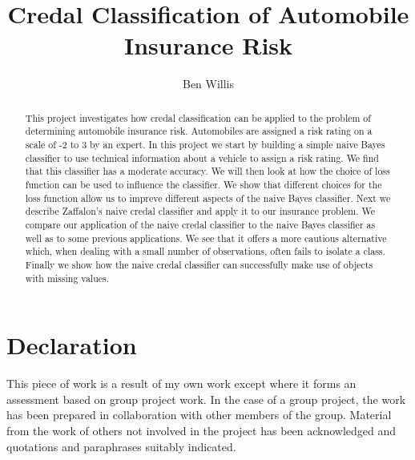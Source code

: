 \documentclass[11pt]{report}
\begin{document}
\title{Credal Classification of Automobile Insurance Risk}
\author{Ben Willis}
\maketitle

\section*{Declaration}
This piece of work is a result of my own work except where it forms an assessment
based on group project work. In the case of a group project, the work
has been prepared in collaboration with other members of the group. Material
from the work of others not involved in the project has been acknowledged and
quotations and paraphrases suitably indicated.
\newpage

\begin{abstract}
	This project investigates how credal classification can be applied to the problem of determining automobile insurance risk.
	Automobiles are assigned a risk rating on a scale of -2 to 3 by an expert.
	In this project we start by building a simple naive Bayes classifier to use technical information about a vehicle to assign a risk rating.
	We find that this classifier has a moderate accuracy.
	We will then look at how the choice of loss function can be used to influence the classifier.
	We show that different choices for the loss function allow us to impreve different aspects of the naive Bayes classifier.
	Next we describe Zaffalon's naive credal classifier and apply it to our insurance problem.
	We compare our application of the naive credal classifier to the naive Bayes classifier as well as to some previous applications.
	We see that it offers a more cautious alternative which, when dealing with a small number of observations, often fails to isolate a class.
	Finally we show how the naive credal classifier can successfully make use of objects with missing values.
\end{abstract}

\tableofcontents













\end{document}
